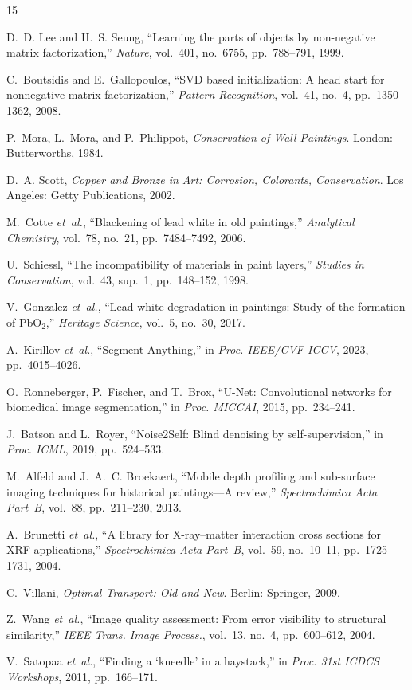 \documentclass[conference]{IEEEtran}
\begin{document}
\begin{thebibliography}{15}

D.~D. Lee and H.~S. Seung, ``Learning the parts of objects by non-negative matrix factorization,'' \emph{Nature}, vol.~401, no.~6755, pp.~788--791, 1999.

C.~Boutsidis and E.~Gallopoulos, ``SVD based initialization: A head start for nonnegative matrix factorization,'' \emph{Pattern Recognition}, vol.~41, no.~4, pp.~1350--1362, 2008.

P.~Mora, L.~Mora, and P.~Philippot, \emph{Conservation of Wall Paintings}. London: Butterworths, 1984.

D.~A. Scott, \emph{Copper and Bronze in Art: Corrosion, Colorants, Conservation}. Los Angeles: Getty Publications, 2002.

M.~Cotte \emph{et~al.}, ``Blackening of lead white in old paintings,'' \emph{Analytical Chemistry}, vol.~78, no.~21, pp.~7484--7492, 2006.

U.~Schiessl, ``The incompatibility of materials in paint layers,'' \emph{Studies in Conservation}, vol.~43, sup.~1, pp.~148--152, 1998.

V.~Gonzalez \emph{et~al.}, ``Lead white degradation in paintings: Study of the formation of PbO$_2$,'' \emph{Heritage Science}, vol.~5, no.~30, 2017.

A.~Kirillov \emph{et~al.}, ``Segment Anything,'' in \emph{Proc. IEEE/CVF ICCV}, 2023, pp.~4015--4026.

O.~Ronneberger, P.~Fischer, and T.~Brox, ``U-Net: Convolutional networks for biomedical image segmentation,'' in \emph{Proc. MICCAI}, 2015, pp.~234--241.

J.~Batson and L.~Royer, ``Noise2Self: Blind denoising by self-supervision,'' in \emph{Proc. ICML}, 2019, pp.~524--533.

M.~Alfeld and J.~A.~C. Broekaert, ``Mobile depth profiling and sub-surface imaging techniques for historical paintings---A review,'' \emph{Spectrochimica Acta Part~B}, vol.~88, pp.~211--230, 2013.

A.~Brunetti \emph{et~al.}, ``A library for X-ray--matter interaction cross sections for XRF applications,'' \emph{Spectrochimica Acta Part~B}, vol.~59, no.~10--11, pp.~1725--1731, 2004.

C.~Villani, \emph{Optimal Transport: Old and New}. Berlin: Springer, 2009.

Z.~Wang \emph{et~al.}, ``Image quality assessment: From error visibility to structural similarity,'' \emph{IEEE Trans. Image Process.}, vol.~13, no.~4, pp.~600--612, 2004.

V.~Satopaa \emph{et~al.}, ``Finding a `kneedle' in a haystack,'' in \emph{Proc. 31st ICDCS Workshops}, 2011, pp.~166--171.

\end{thebibliography}
\end{document}
